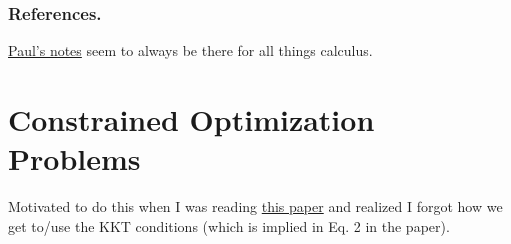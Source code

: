 \documentclass[letterpaper,12pt]{report}
\begin{document}






\subsection*{References.}

\href{http://tutorial.math.lamar.edu/Classes/CalcIII/DirectionalDeriv.aspx}{Paul's notes} 
seem to always be there for all things calculus.

\chapter{Constrained Optimization
Problems}\label{constrained-optimization-problems}

Motivated to do this when I was reading
\href{https://arxiv.org/pdf/1606.05579.pdf}{this paper} and realized I
forgot how we get to/use the KKT conditions (which is implied in Eq. 2
in the paper).
\end{document}
